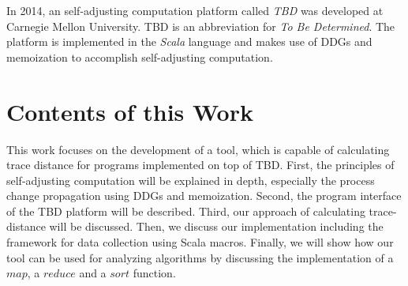 In 2014, an self-adjusting computation platform called \textit{TBD} was developed at Carnegie Mellon University. TBD is an abbreviation for \textit{To Be Determined}. The platform is implemented in the \textit{Scala} language and makes use of DDGs and memoization to accomplish self-adjusting computation. 

\section{Contents of this Work}

This work focuses on the development of a tool, which is capable of calculating trace distance for programs implemented on top of TBD. First, the principles of self-adjusting computation will be explained in depth, especially the process change propagation using DDGs and memoization. Second, the program interface of the TBD platform will be described. Third, our approach of calculating trace-distance will be discussed. Then, we discuss our implementation including the framework for data collection using Scala macros. 
Finally, we will show how our tool can be used for analyzing algorithms by discussing the implementation of a $map$, a $reduce$ and a $sort$ function.  